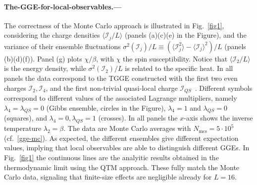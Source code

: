 \documentclass[twocolumn,superscriptaddress,prb,10pt]{revtex4-1}
\begin{document}
\paragraph*{The-GGE-for-local-observables.---} 

The correctness of the Monte Carlo approach is illustrated in Fig.~\ref{fig1}, considering 
the charge densities $\langle {\mathcal I}_j/L\rangle$ (panels (a)(c)(e) in the Figure), 
and the variance of their ensemble fluctuations $\sigma^2({\mathcal I}_j)/L\equiv
(\langle{\mathcal I}_j^2\rangle-\langle{\mathcal I}_j\rangle^2)/L$ (panels (b)(d)(f)). 
Panel (g) plots $\chi/\beta$, with $\chi$ the spin susceptibility. Notice that 
$\langle{\mathcal I}_2/L\rangle$ is the energy 
density, while $\sigma^2({\mathcal I}_2)/L$ is related to the specific heat. In all 
panels the data correspond to the TGGE constructed 
with the first two even charges ${\mathcal I}_2,{\mathcal I}_4$, and the first 
non-trivial quasi-local charge ${\mathcal I}_{QS}$~\cite{ilievski-2015,ilievski-2015a}. 
Different symbols correspond to different values of the associated Lagrange multipliers, 
namely $\lambda_4=\lambda_{QS}=0$ (Gibbs ensemble, circles in the Figure), $\lambda_4=1$ and 
$\lambda_{QS}=0$ (squares), and $\lambda_4=0,\lambda_{QS}=1$ (crosses). 
In all panels the $x$-axis shows the inverse temperature $\lambda_2=\beta$. The data 
are Monte Carlo averages with $N_{\textrm{mcs}}=5\cdot 10^5$ (cf.~\eqref{gge-mc}). 
As expected, the different ensembles give different expectation values, implying that 
local observables are able to distinguish different GGEs.
In Fig.~\ref{fig1} the continuous lines are the analyitic results obtained 
in the thermodynamic limit using the QTM approach. These fully match the Monte 
Carlo data, signaling  that finite-size effects are negligible already for $L=16$.  
\end{document}

